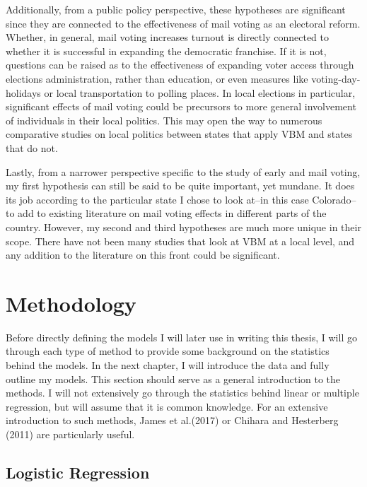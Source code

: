 \documentclass[12pt,twoside]{reedthesis}
\begin{document}
  Additionally, from a public policy perspective, these hypotheses are
  significant since they are connected to the effectiveness of mail voting
  as an electoral reform. Whether, in general, mail voting increases
  turnout is directly connected to whether it is successful in expanding
  the democratic franchise. If it is not, questions can be raised as to
  the effectiveness of expanding voter access through elections
  administration, rather than education, or even measures like
  voting-day-holidays or local transportation to polling places. In local
  elections in particular, significant effects of mail voting could be
  precursors to more general involvement of individuals in their local
  politics. This may open the way to numerous comparative studies on local
  politics between states that apply VBM and states that do not.
  
  Lastly, from a narrower perspective specific to the study of early and
  mail voting, my first hypothesis can still be said to be quite
  important, yet mundane. It does its job according to the particular
  state I chose to look at--in this case Colorado--to add to existing
  literature on mail voting effects in different parts of the country.
  However, my second and third hypotheses are much more unique in their
  scope. There have not been many studies that look at VBM at a local
  level, and any addition to the literature on this front could be
  significant.
  
  \section{Methodology}\label{methodology}
  
  Before directly defining the models I will later use in writing this
  thesis, I will go through each type of method to provide some background
  on the statistics behind the models. In the next chapter, I will
  introduce the data and fully outline my models. This section should
  serve as a general introduction to the methods. I will not extensively
  go through the statistics behind linear or multiple regression, but will
  assume that it is common knowledge. For an extensive introduction to
  such methods, James et al.(2017) or Chihara and Hesterberg (2011) are
  particularly useful.
  
  \subsection{Logistic Regression}\label{logistic-regression}
  
\end{document}
